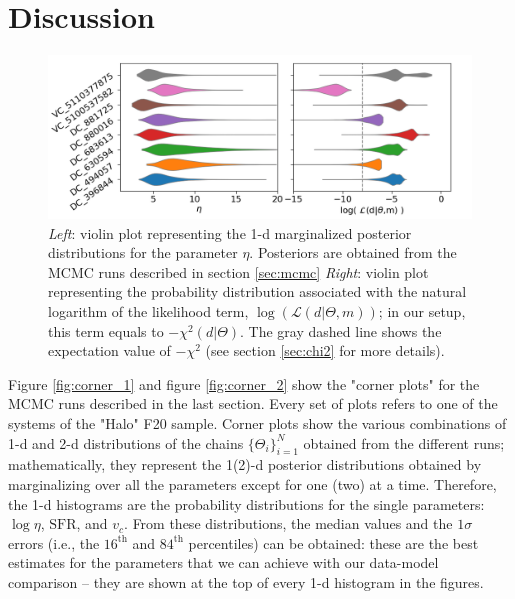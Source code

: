 \section{Discussion} \label{sec:results}

\begin{figure}
    \centering
    \includegraphics[width=1.0\textwidth]{plots/violin_new.png}
    \caption{\textit{Left}: violin plot representing the 1-d marginalized posterior distributions for the parameter $\eta$. Posteriors are obtained from the MCMC runs described in section \ref{sec:mcmc} \textit{Right}: violin plot representing the probability distribution associated with the natural logarithm of the likelihood term, $\log( \mathcal{L}(d|\Theta,m))$; in our setup, this term equals to $-\chi^2(d|\Theta)$. The gray dashed line shows the expectation value of $-\chi^2$ (see section \ref{sec:chi2} for more details).
    \label{fig:violin}
    }
\end{figure}



Figure \ref{fig:corner_1} and figure \ref{fig:corner_2} show the "corner plots" for the MCMC runs described in the last section. Every set of plots refers to one of the systems of the "\CII Halo" F20 sample. Corner plots show the various combinations of 1-d and 2-d distributions of the chains $\{\Theta_i\}_{i=1}^N$ obtained from the different runs; mathematically, they represent the 1(2)-d posterior distributions obtained by marginalizing over all the parameters except for one (two) at a time.
%
Therefore, the 1-d histograms are the probability distributions for the single parameters: $\log\eta$, $\mathrm{SFR}$, and $v_c$. From these distributions, the median values and the $1\sigma$ errors (i.e., the $16^\mathrm{th}$ and $84^\mathrm{th}$ percentiles) can be obtained: these are the best estimates for the parameters that we can achieve with our data-model comparison -- they are shown at the top of every 1-d histogram in the figures.


